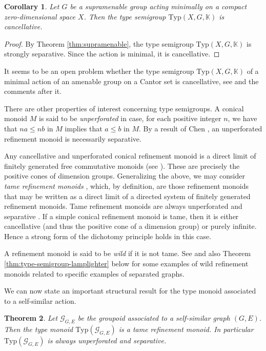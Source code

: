 \documentclass[11pt]{amsart}
\theoremstyle{plain}            %
\newtheorem{theorem}{Theorem}[section]
\newtheorem{corollary}[theorem]{Corollary}
\theoremstyle{definition}       %
\theoremstyle{definition}       %
\theoremstyle{remark}
\newcommand{\Typ}{\mathrm{Typ}}
\begin{document}
\begin{corollary}
\label{cor:minimalcase-cancellative} 
Let $G$ be a supramenable group acting minimally on a compact zero-dimensional space $X$. Then the type semigroup $\Typ (X,G,\mathbb K)$ is cancellative.
\end{corollary}

\begin{proof}
By Theorem \ref{thm:supramenable}, the type semigroup $\Typ (X,G,\mathbb K)$ is strongly separative. 
Since the action is minimal, it is cancellative. 
\end{proof}

It seems to be an open problem whether the type semigroup $\Typ (X,G,\mathbb K)$ of a minimal action of an amenable group on a Cantor set is cancellative, see \cite[Proposition 2.20]{Melleray}
and the comments after it. 

There are other properties of interest concerning type semigroups. A conical monoid $M$ is said to be {\it unperforated} in case, for each positive integer $n$, we have that $na\le nb$ in $M$ implies that $a\le b$ in $M$. By a result of Chen \cite[Theorem 1]{chen}, an unperforated refinement monoid is necessarily separative. 

Any cancellative and unperforated conical refinement monoid is a direct limit of finitely generated free commutative monoids (see \cite[Theorem 3.14]{ag15}). These are precisely the 
positive cones of dimension groups. 
Generalizing the above, we may consider {\it tame refinement monoids} \cite{ag15}, which, by definition, are those refinement monoids that may be written as a direct limit of
a directed system of finitely generated refinement monoids. Tame refinement monoids are always unperforated and separative \cite[Theorem 3.14]{ag15}. If a simple conical refinement monoid is
tame, then it is either cancellative (and thus the positive cone of a dimension group) or purely infinite. Hence a strong form of the dichotomy principle holds in this case.

A refinement monoid is said to be {\it wild} if it is not tame. See \cite{ag15} and also Theorem \ref{thm:type-semigroup-lamplighter} below for some examples of wild refinement monoids related to 
specific examples of separated graphs.

We can now state an important structural result for the type monoid associated to a self-similar action. 

\begin{theorem}
\label{thm:type-monoid-self-similar}
Let $\mathcal G _{G,E}$ be the groupoid associated to a self-similar graph $(G,E)$. Then the type monoid $\Typ (\mathcal G_{G,E})$ is a tame refinement monoid.
In particular $\Typ (\mathcal G_{G,E})$ is always unperforated and separative. 
\end{theorem}
\end{document}
